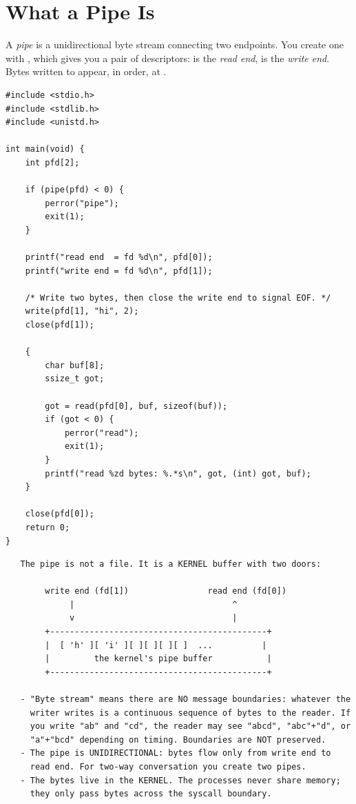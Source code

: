 \section{What a Pipe Is}

A \emph{pipe} is a unidirectional byte stream connecting two endpoints.
You create one with , which gives you a pair of
descriptors:  is the \emph{read end},  is
the \emph{write end}. Bytes written to  appear, in order,
at .

\begin{lstlisting}[caption={A pipe is two descriptors: read end and write end.}]
#include <stdio.h>
#include <stdlib.h>
#include <unistd.h>

int main(void) {
    int pfd[2];

    if (pipe(pfd) < 0) {
        perror("pipe");
        exit(1);
    }

    printf("read end  = fd %d\n", pfd[0]);
    printf("write end = fd %d\n", pfd[1]);

    /* Write two bytes, then close the write end to signal EOF. */
    write(pfd[1], "hi", 2);
    close(pfd[1]);

    {
        char buf[8];
        ssize_t got;

        got = read(pfd[0], buf, sizeof(buf));
        if (got < 0) {
            perror("read");
            exit(1);
        }
        printf("read %zd bytes: %.*s\n", got, (int) got, buf);
    }

    close(pfd[0]);
    return 0;
}
\end{lstlisting}

\begin{verbatim}
   The pipe is not a file. It is a KERNEL buffer with two doors:

        write end (fd[1])                read end (fd[0])
             |                                ^
             v                                |
        +--------------------------------------------+
        |  [ 'h' ][ 'i' ][ ][ ][ ][ ]  ...          |
        |         the kernel's pipe buffer           |
        +--------------------------------------------+

   - "Byte stream" means there are NO message boundaries: whatever the
     writer writes is a continuous sequence of bytes to the reader. If
     you write "ab" and "cd", the reader may see "abcd", "abc"+"d", or
     "a"+"bcd" depending on timing. Boundaries are NOT preserved.
   - The pipe is UNIDIRECTIONAL: bytes flow only from write end to
     read end. For two-way conversation you create two pipes.
   - The bytes live in the KERNEL. The processes never share memory;
     they only pass bytes across the syscall boundary.
\end{verbatim}

